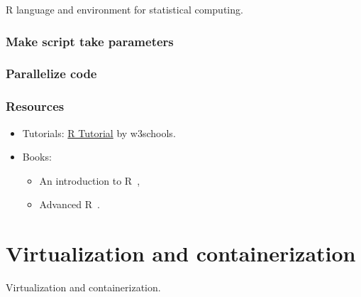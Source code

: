 \documentclass[aspectratio=169]{beamer}
\begin{document}
\begin{frame}
    R language and environment for statistical computing.
\end{frame}

\begin{frame}
    \frametitle{Make script take parameters}
\end{frame}

\begin{frame}
    \frametitle{Parallelize code}
\end{frame}

\begin{frame}
    \frametitle{Resources}
    \begin{itemize}
        \item Tutorials: \href{https://www.w3schools.com/r/default.asp}
            {R Tutorial} by w3schools.
        \item Books: 
            \begin{itemize}
                \item An introduction to R~\cite{venables2024},
                \item Advanced R~\cite{wickham2015a}.
            \end{itemize}
    \end{itemize}
\end{frame}






\section{Virtualization and containerization}



\begin{frame}
    Virtualization and containerization.
\end{frame}
\end{document}
